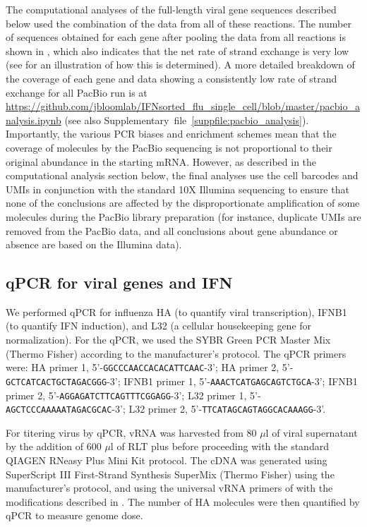 \documentclass[9pt,lineno]{elife}
\begin{document}
The computational analyses of the full-length viral gene sequences described below used the combination of the data from all of these reactions.
The number of sequences obtained for each gene after pooling the data from all reactions is shown in , which also indicates that the net rate of strand exchange is very low (see  for an illustration of how this is determined).
A more detailed breakdown of the coverage of each gene and data showing a consistently low rate of strand exchange for all PacBio run is at \url{https://github.com/jbloomlab/IFNsorted_flu_single_cell/blob/master/pacbio_analysis.ipynb} (see also Supplementary~file~\ref{suppfile:pacbio_analysis}).
Importantly, the various PCR biases and enrichment schemes mean that the coverage of molecules by the PacBio sequencing is not proportional to their original abundance in the starting mRNA.
However, as described in the computational analysis section below, the final analyses use the cell barcodes and UMIs in conjunction with the standard 10X Illumina sequencing to ensure that none of the conclusions are affected by the disproportionate amplification of some molecules during the PacBio library preparation (for instance, duplicate UMIs are removed from the PacBio data, and all conclusions about gene abundance or absence are based on the Illumina data).

\subsection{qPCR for viral genes and IFN}
We performed qPCR for influenza HA (to quantify viral transcription), IFNB1 (to quantify IFN induction), and L32 (a cellular housekeeping gene for normalization).
For the qPCR, we used the SYBR Green PCR Master Mix (Thermo Fisher) according to the manufacturer's protocol.
The qPCR primers were: HA primer 1, 5'-\texttt{GGCCCAACCACACATTCAAC}-3'; HA primer 2, 5'-\texttt{GCTCATCACTGCTAGACGGG}-3'; IFNB1 primer 1, 5'-\texttt{AAACTCATGAGCAGTCTGCA}-3'; IFNB1 primer 2, 5'-\texttt{AGGAGATCTTCAGTTTCGGAGG}-3'; L32 primer 1, 5'-\texttt{AGCTCCCAAAAATAGACGCAC}-3'; L32 primer 2, 5'-\texttt{TTCATAGCAGTAGGCACAAAGG}-3'. 

For titering virus by qPCR, vRNA was harvested from 80 $\mu$l of viral supernatant by the addition of 600 $\mu$l of RLT plus before proceeding with the standard QIAGEN RNeasy Plus Mini Kit protocol. 
The cDNA was generated using SuperScript III First-Strand Synthesis SuperMix (Thermo Fisher) using the manufacturer's protocol, and using the universal vRNA primers of \citet{hoffmann2001universal} with the modifications described in \citet{xue2017parallel}. 
The number of HA molecules were then quantified by qPCR to measure genome dose. 
\end{document}

